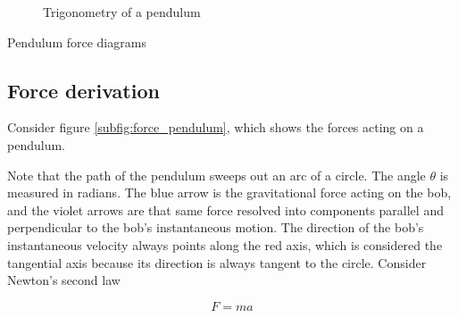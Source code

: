 \begin{bookfigure}
\begin{subfigure}{0.5\textwidth}
    \caption{Trigonometry of a pendulum}
    \label{subfig:trig_pendulum}
  \end{subfigure}
  \caption{Pendulum force diagrams}
\end{bookfigure}

\subsection{Force derivation}

Consider figure \ref{subfig:force_pendulum}, which shows the forces acting on a
pendulum.

Note that the path of the pendulum sweeps out an arc of a circle. The angle
$\theta$ is measured in radians. The blue arrow is the gravitational force
acting on the bob, and the violet arrows are that same force resolved into
components parallel and perpendicular to the bob's instantaneous motion. The
direction of the bob's instantaneous velocity always points along the red axis,
which is considered the tangential axis because its direction is always tangent
to the circle. Consider Newton's second law

\begin{equation*}
  F = ma
\end{equation*}

